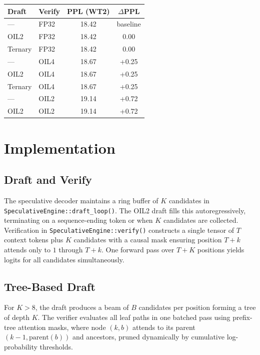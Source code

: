 \begin{center}
\begin{tabular}{llcc}
\toprule
\textbf{Draft} & \textbf{Verify} & \textbf{PPL (WT2)}
  & $\Delta$\textbf{PPL} \\
\midrule
---     & FP32 & 18.42 & baseline \\
OIL2    & FP32 & 18.42 & 0.00 \\
Ternary & FP32 & 18.42 & 0.00 \\
---     & OIL4 & 18.67 & +0.25 \\
OIL2    & OIL4 & 18.67 & +0.25 \\
Ternary & OIL4 & 18.67 & +0.25 \\
---     & OIL2 & 19.14 & +0.72 \\
OIL2    & OIL2 & 19.14 & +0.72 \\
\bottomrule
\end{tabular}
\end{center}

\label{tab:spec_quality}

\section{Implementation}
\label{sec:implementation}

\subsection{Draft and Verify}

The speculative decoder maintains a ring buffer of $K$ candidates in
\texttt{SpeculativeEngine::draft\_loop()}. The OIL2 draft fills this
autoregressively, terminating on a sequence-ending token or when $K$
candidates are collected. Verification in
\texttt{SpeculativeEngine::verify()} constructs a single tensor of $T$
context tokens plus $K$ candidates with a causal mask ensuring position
$T+k$ attends only to $1$ through $T+k$. One forward pass over $T+K$
positions yields logits for all candidates simultaneously.

\subsection{Tree-Based Draft}

For $K > 8$, the draft produces a beam of $B$ candidates per position
forming a tree of depth $K$. The verifier evaluates all leaf paths in
one batched pass using prefix-tree attention masks, where node $(k,b)$
attends to its parent $(k-1, \text{parent}(b))$ and ancestors, pruned
dynamically by cumulative log-probability thresholds.

